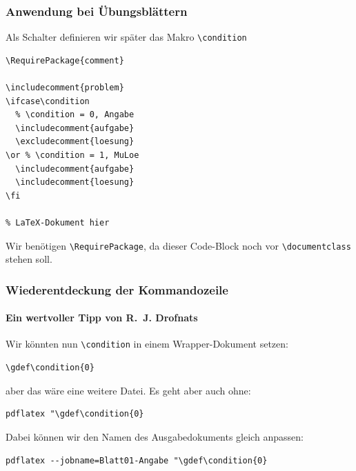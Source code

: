 \documentclass[]{beamer}
\begin{document}
\begin{frame}[fragile]
\frametitle{Anwendung bei Übungsblättern}

Als Schalter definieren wir später das Makro \verb+\condition+

\begin{center}
\begin{minipage}{0.45\linewidth}
\begin{lstlisting}[style=arn:lst:tex, title={\texttt{Blatt01.tex}}]
\RequirePackage{comment}

\includecomment{problem}
\ifcase\condition
  % \condition = 0, Angabe
  \includecomment{aufgabe}
  \excludecomment{loesung}
\or % \condition = 1, MuLoe
  \includecomment{aufgabe}
  \includecomment{loesung}
\fi

% LaTeX-Dokument hier
\end{lstlisting}
\end{minipage}
\end{center}

Wir benötigen \verb+\RequirePackage+, da dieser Code-Block noch vor \verb+\documentclass+ stehen soll.
\end{frame}

\begin{frame}[fragile]
\frametitle{Wiederentdeckung der Kommandozeile}
\framesubtitle{Ein wertvoller Tipp von R.~J. Drofnats}

Wir könnten nun \verb+\condition+ in einem Wrapper-Dokument setzen:

\begin{center}
\begin{minipage}{0.45\linewidth}
\begin{lstlisting}[style=arn:lst:tex]
\gdef\condition{0}

\end{lstlisting}
\end{minipage}
\end{center}

aber das wäre eine weitere Datei.\pause{} Es geht aber auch ohne:

\begin{center}
\begin{minipage}{0.8\linewidth}
\begin{lstlisting}[style=arn:lst:bash]
pdflatex "\gdef\condition{0} 
\end{lstlisting}
\end{minipage}
\end{center}

\pause Dabei können wir den Namen des Ausgabedokuments gleich anpassen:

\begin{center}
\begin{minipage}{0.8\linewidth}
\begin{lstlisting}[style=arn:lst:bash]
pdflatex --jobname=Blatt01-Angabe "\gdef\condition{0} 
\end{lstlisting}
\end{minipage}
\end{center}

\end{frame}
\end{document}

